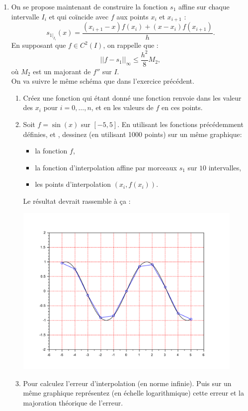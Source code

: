 \documentclass[a4paper,12pt,reqno]{amsart}
\begin{document}
\begin{exo}
\begin{enumerate}
    \item On se propose maintenant de construire la fonction $s_1$ affine sur chaque intervalle $I_i$ et qui coïncide avec $f$ aux points $x_i$ et $x_{i+1}$ :
      $$
        s_{1|_{I_i}}(x)= \frac{(x_{i+1}-x)f(x_i)+(x-x_i)f(x_{i+1})}{h}.
      $$
      En supposant que $f \in C^2(I)$, on rappelle que  :
      $$
        ||f-s_1||_{\infty}\leq \frac{h^2}{8} M_2,
      $$
      où $M_2$ est un majorant de $f''$ sur $I$.\\
      On va suivre le même schéma que dans l'exercice précédent.
      \begin{enumerate}
      \item Créez une fonction  qui étant donné une fonction  renvoie dans  les valeur des $x_{i}$ pour $i=0,\ldots,n$, et en  les valeurs de $f$ en ces points.

      \item Soit $f=\sin(x)$ sur $[-5,5]$. En utilisant les fonctions précédemment définies,  et , dessinez (en utilisant 1000 points) sur un même graphique:
      \begin{itemize}
        \item la fonction $f$,
        \item la fonction d'interpolation affine par morceaux $s_{1}$ sur $10$ intervalles,
        \item les points d'interpolation $(x_{i},f(x_{i}))$.
      \end{itemize}
      Le résultat devrait rassemble à ça :
      \begin{center}
        \includegraphics[width=11cm]{SciLab_test_interp_affine}
      \end{center}

      \item Pour  calculez l'erreur d'interpolation (en norme infinie). Puis sur un même graphique représentez (en échelle logarithmique) cette erreur et la majoration théorique de l'erreur.
    \end{enumerate}
  \end{enumerate}
\end{exo}
\end{document}
